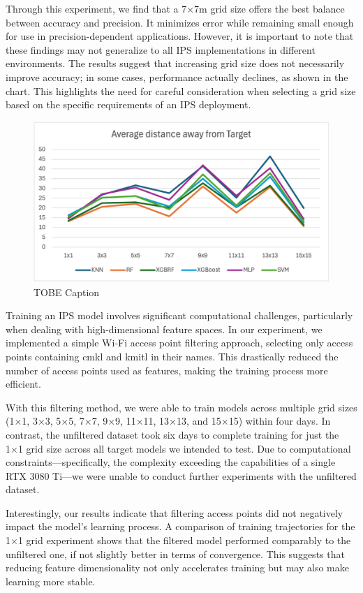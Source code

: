 \documentclass[conference]{IEEEtran}
\begin{document}
	Through this experiment, we find that a 7×7m grid size offers the best balance between accuracy and precision. It minimizes error while remaining small enough for use in precision-dependent applications. However, it is important to note that these findings may not generalize to all IPS implementations in different environments. The results suggest that increasing grid size does not necessarily improve accuracy; in some cases, performance actually declines, as shown in the chart. This highlights the need for careful consideration when selecting a grid size based on the specific requirements of an IPS deployment.
	
	\begin{figure}[htbp]
		\centerline{\includegraphics[scale=0.65]{image2.png}}
		\caption{TOBE Caption}
		\label{fig3}
	\end{figure}
	
	Training an IPS model involves significant computational challenges, particularly when dealing with high-dimensional feature spaces. In our experiment, we implemented a simple Wi-Fi access point filtering approach, selecting only access points containing cmkl and kmitl in their names. This drastically reduced the number of access points used as features, making the training process more efficient.
	
	With this filtering method, we were able to train models across multiple grid sizes (1×1, 3×3, 5×5, 7×7, 9×9, 11×11, 13×13, and 15×15) within four days. In contrast, the unfiltered dataset took six days to complete training for just the 1×1 grid size across all target models we intended to test. Due to computational constraints—specifically, the complexity exceeding the capabilities of a single RTX 3080 Ti—we were unable to conduct further experiments with the unfiltered dataset.
	
	Interestingly, our results indicate that filtering access points did not negatively impact the model's learning process. A comparison of training trajectories for the 1×1 grid experiment shows that the filtered model performed comparably to the unfiltered one, if not slightly better in terms of convergence. This suggests that reducing feature dimensionality not only accelerates training but may also make learning more stable.
	
\end{document}
